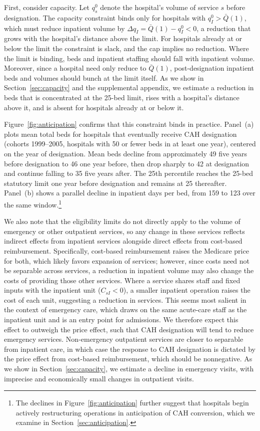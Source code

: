 \documentclass[a4paper, 12pt, twoside]{article}
\begin{document}
First, consider capacity. Let $q_s^0$ denote the hospital's volume of service $s$ before designation. The capacity constraint binds only for hospitals with $q_I^0 > \bar{Q}(1)$, which must reduce inpatient volume by $\Delta q_I = \bar{Q}(1) - q_I^0 < 0$, a reduction that grows with the hospital's distance above the limit. For hospitals already at or below the limit the constraint is slack, and the cap implies no reduction. Where the limit is binding, beds and inpatient staffing should fall with inpatient volume. Moreover, since a hospital need only reduce to $\bar{Q}(1)$, post-designation inpatient beds and volumes should bunch at the limit itself. As we show in Section~\ref{sec:capacity} and the supplemental appendix, we estimate a reduction in beds that is concentrated at the 25-bed limit, rises with a hospital's distance above it, and is absent for hospitals already at or below it.

Figure~\ref{fig:anticipation} confirms that this constraint binds in practice. Panel~(a) plots mean total beds for hospitals that eventually receive CAH designation (cohorts 1999--2005, hospitals with 50 or fewer beds in at least one year), centered on the year of designation. Mean beds decline from approximately 49 five years before designation to 46 one year before, then drop sharply to 42 at designation and continue falling to 35 five years after. The 25th percentile reaches the 25-bed statutory limit one year before designation and remains at 25 thereafter. Panel~(b) shows a parallel decline in inpatient days per bed, from 159 to 123 over the same window.\footnote{The declines in Figure~\ref{fig:anticipation} further suggest that hospitals begin actively restructuring operations in anticipation of CAH conversion, which we examine in Section~\ref{sec:anticipation}.}

We also note that the eligibility limits do not directly apply to the volume of emergency or other outpatient services, so any change in these services reflects indirect effects from inpatient services alongside direct effects from cost-based reimbursement. Specifically, cost-based reimbursement raises the Medicare price for both, which likely favors expansion of services; however, since costs need not be separable across services, a reduction in inpatient volume may also change the costs of providing those other services. Where a service shares staff and fixed inputs with the inpatient unit ($C_{sI} < 0$), a smaller inpatient operation raises the cost of each unit, suggesting a reduction in services. This seems most salient in the context of emergency care, which draws on the same acute-care staff as the inpatient unit and is an entry point for admissions. We therefore expect this effect to outweigh the price effect, such that CAH designation will tend to reduce emergency services. Non-emergency outpatient services are closer to separable from inpatient care, in which case the response to CAH designation is dictated by the price effect from cost-based reimbursement, which should be nonnegative. As we show in Section~\ref{sec:capacity}, we estimate a decline in emergency visits, with imprecise and economically small changes in outpatient visits.
\end{document}
